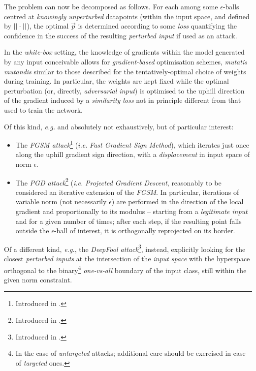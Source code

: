 The problem can now be decomposed as follows. For each among some $\epsilon$-balls centred at \textit{knowingly unperturbed} datapoints (within the input space, and defined by $||\cdot||$), the optimal $\vec{p}$ is determined according to some \textit{loss} quantifying the confidence in the success of the resulting \textit{perturbed input} if used as an attack.

In the \textit{white-box} setting, the knowledge of gradients within the model generated by any input conceivable allows for \textit{gradient-based} optimisation schemes, \textit{mutatis mutandis} similar to those described for the tentatively-optimal choice of weights during training. In particular, the weights are kept fixed while the optimal perturbation (or, directly, \textit{adversarial input}) is optimised \wrt to the uphill direction of the gradient induced by a \textit{similarity loss} not in principle different from that used to train the network.

Of this kind, \textit{e.g.} and absolutely not exhaustively, but of particular interest:
\begin{itemize}
    \item The \textit{FGSM attack}\footnote{Introduced in \cite{Goodfellow2015Harnessing}.} (\textit{i.e.} \textit{Fast Gradient Sign Method}), which iterates just once along the uphill gradient sign direction, with a \textit{displacement} in input space of norm $\epsilon$.
    \item The \textit{PGD attack}\footnote{Introduced in \cite{MadryEtAl2018Towards}.} (\textit{i.e.} \textit{Projected Gradient Descent}, reasonably to be considered an iterative extension of the \textit{FGSM}. In particular, iterations of variable norm (not necessarily $\epsilon$) are performed in the direction of the local gradient and proportionally to its modulus -- starting from a \textit{legitimate input} and for a given number of times; after each step, if the resulting point falls outside the $\epsilon$-ball of interest, it is orthogonally reprojected on its border.
\end{itemize}

Of a different kind, \textit{e.g.}, the \textit{DeepFool attack}\footnote{Introduced in \cite{MoosaviDezfooli2016DeepFool}.}, instead, explicitly looking for the closest \textit{perturbed inputs} at the intersection of the \textit{input space} with the hyperspace orthogonal to the binary\footnote{In the case of \textit{untargeted} attacks; additional care should be exercised in case of \textit{targeted} ones.} \textit{one-vs-all} boundary of the input class, still within the given norm constraint.

